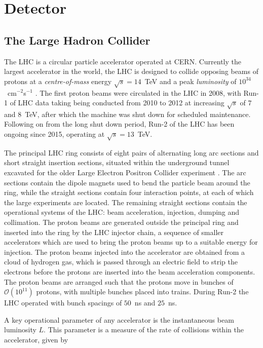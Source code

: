 \chapter{Detector}\label{c:Det}

\section{The Large Hadron Collider}
\label{d:lhc}

	The LHC is a circular particle accelerator operated at CERN. Currently the largest accelerator in the world, the LHC is designed to collide opposing beams of protons at a \textit{centre-of-mass} energy $\sqrt{s}=14$~TeV and a peak \textit{luminosity} of $10^{34}$~cm$^{-2}$s$^{-1}$ \cite{lhc}. The first proton beams were circulated in the LHC in 2008, with Run-1 of LHC data taking being conducted from 2010 to 2012 at increasing $\sqrt{s}$ of $7$ and $8$~TeV, after which the machine was shut down for scheduled maintenance. Following on from the long shut down period, Run-2 of the LHC has been ongoing since 2015, operating at $\sqrt{s}=13$~TeV.

	The principal LHC ring consists of eight pairs of alternating long arc sections and short straight insertion sections, situated within the underground tunnel excavated for the older Large Electron Positron Collider experiment \cite{lep1, lep2}. The arc sections contain the dipole magnets used to bend the particle beam around the ring, while the straight sections contain four interaction points, at each of which the large experiments are located. The remaining straight sections contain the operational systems of the LHC: beam acceleration, injection,  dumping and collimation. The proton beams are generated outside the principal ring and inserted into the ring by the LHC injector chain, a sequence of smaller accelerators which are used to bring the proton beams up to a suitable energy for injection. The proton beams injected into the accelerator are obtained from a cloud of hydrogen gas, which is passed through an electric field to strip the electrons before the protons are inserted into the beam acceleration components. The proton beams are arranged such that the protons move in bunches of $\mathcal{O}(10^{11})$ protons, with multiple bunches placed into trains. During Run-2 the LHC operated with bunch spacings of $50$~ns and $25$~ns.

	A key operational parameter of any accelerator is the instantaneous beam luminosity $L$. This parameter is a measure of the rate of collisions within the accelerator, given by

